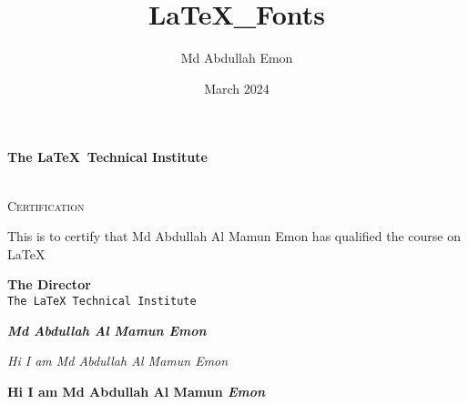 \documentclass[a4paper,12pt]{letter}
\title{LaTeX_Fonts}
\author{Md Abdullah Emon}
\date{March 2024}
\begin{document}
    \begin{center}
        \begin{huge}
            \textbf{The \LaTeX\ Technical Institute}
        \end{huge}
        
        \begin{LARGE}
            \textsc{\\Certification}
        \end{LARGE}
    \end{center}
\begin{flushleft}
    This is to certify that Md Abdullah Al Mamun Emon has qualified the course on \LaTeX\
\end{flushleft}
\begin{flushright}
    \textbf{The Director}
    \texttt{\\ The \LaTeX\ Technical Institute}
\end{flushright}

\begin{center}
    \textit{\textbf{Md Abdullah Al Mamun Emon}}
\end{center}

\begin{flushleft}
    \textit{Hi I am Md Abdullah Al Mamun \emph{Emon}}
\end{flushleft}
\begin{flushleft}
    \textbf{Hi I am Md Abdullah Al Mamun \emph{Emon}}
\end{flushleft}
\end{document}
